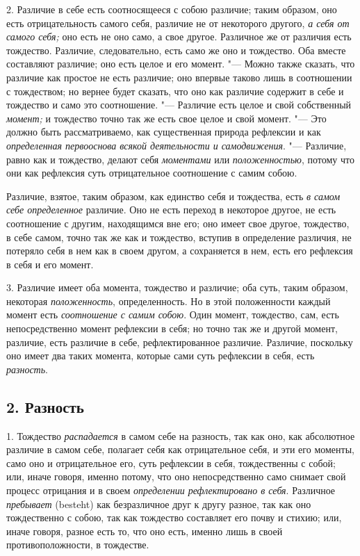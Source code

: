 2. Различие в себе есть соотносящееся с собою различие; таким образом, оно
есть отрицательность самого себя, различие не от некоторого другого,
{\em а себя от самого себя;} оно есть не оно само, а
свое другое. Различное же от различия есть тождество. Различие,
следовательно, есть само же оно и тождество. Оба вместе составляют
различие; оно есть целое и его момент. "--- Можно также сказать, что различие
как простое не есть различие; оно впервые таково лишь в соотношении с
тождеством; но вернее будет сказать, что оно как различие содержит в себе и
тождество и само это соотношение. "--- Различие есть целое и свой собственный
{\em момент;} и тождество точно так же есть свое целое
и свой момент. "--- Это должно быть рассматриваемо, как существенная природа
рефлексии и как {\em определенная первооснова всякой
деятельности и самодвижения}. "--- Различие, равно как и тождество, делают
себя {\em моментами} или
{\em положенностью}, потому что они как рефлексия суть
отрицательное соотношение с самим собою.

Различие, взятое, таким образом, как единство себя и тождества, есть
{\em в самом себе определенное} различие. Оно не есть
переход в некоторое другое, не есть соотношение с другим, находящимся вне
его; оно имеет свое другое, тождество, в себе самом, точно так же как и
тождество, вступив в определение различия, не потеряло себя в нем как в
своем другом, а сохраняется в нем, есть его рефлексия в себя и его момент.

3. Различие имеет оба момента, тождество и различие; оба суть, таким
образом, некоторая {\em положенность}, определенность.
Но в этой положенности каждый момент есть
{\em соотношение с самим собою}. Один момент,
тождество, сам, есть непосредственно момент рефлексии в себя; но точно так
же и другой момент, различие, есть различие в себе, рефлектированное
различие. Различие, поскольку оно имеет два таких момента, которые сами
суть рефлексии в себя, есть {\em разность}.

\subsection[2. Разность]{2. Разность}
1. Тождество {\em распадается} в самом себе на разность, так как
оно, как абсолютное различие в самом себе, полагает себя как отрицательное
себя, и эти его моменты, само оно и отрицательное его, суть рефлексии в
себя, тождественны с собой; или, иначе говоря, именно потому, что оно
непосредственно само снимает свой процесс отрицания и в своем
{\em определении рефлектировано в себя}. Различное
{\em пребывает} (besteht) как безразличное друг к другу
разное, так как оно тождественно с собою, так как тождество составляет его
почву и стихию; или, иначе говоря, разное есть то, что оно есть, именно
лишь в своей противоположности, в тождестве.


